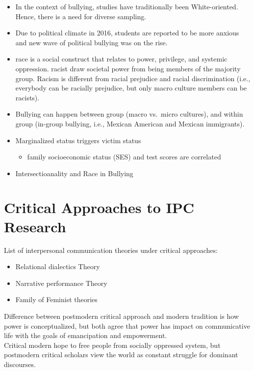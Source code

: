 \documentclass[
]{book}
\providecommand{\tightlist}{%
  \setlength{\itemsep}{0pt}\setlength{\parskip}{0pt}}
\begin{document}
\citep{Harris_2018}

\begin{itemize}
\item
  In the context of bullying, studies have traditionally been White-oriented. Hence, there is a need for diverse
  sampling.
\item
  Due to political climate in 2016, students are reported to be more anxious and new wave of political bullying was on
  the rise.
\item
  race is a social construct that relates to power, privilege, and systemic oppression. racist draw societal power
  from being members of the majority group. Racism is different from racial prejudice and racial discrimination (i.e.,
  everybody can be racially prejudice, but only macro culture members can be racists).
\item
  Bullying can happen between group (macro vs.~micro cultures), and within group (in-group bullying, i.e., Mexican
  American and Mexican immigrants).
\item
  Marginalized status triggers victim status

  \begin{itemize}
  \tightlist
  \item
    family socioeconomic status (SES) and test scores are correlated
  \end{itemize}
\item
  Intersectioanality and Race in Bullying
\end{itemize}

\hypertarget{critical-approaches-to-ipc-research}{%
\section{Critical Approaches to IPC Research}\label{critical-approaches-to-ipc-research}}

List of interpersonal communication theories under critical approaches:

\begin{itemize}
\tightlist
\item
  Relational dialectics Theory
\item
  Narrative performance Theory
\item
  Family of Feminist theories
\end{itemize}

Difference between postmodern critical approach and modern tradition is how power is conceptualized, but both agree that
power has impact on communicative life with the goals of emancipation and empowerment.\\
Critical modern hope to free people from socially oppressed system, but postmodern critical scholars view the world as
constant struggle for dominant discourses.
\end{document}
